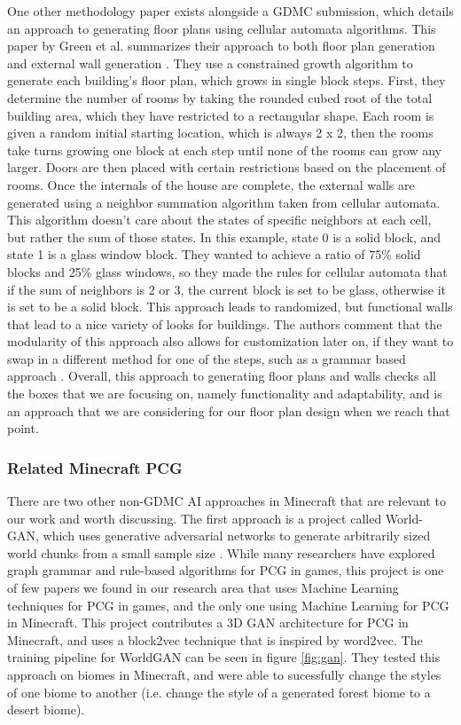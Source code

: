 \documentclass[11pt, oneside]{article}
\begin{document}
\begin{normalsize}
One other methodology paper exists alongside a GDMC submission, which details an approach to generating floor plans using cellular automata algorithms. This paper by Green et al. summarizes their approach to both floor plan generation and external wall generation \cite{green_organic_2019}. They use a constrained growth algorithm to generate each building's floor plan, which grows in single block steps. First, they determine the number of rooms by taking the rounded cubed root of the total building area, which they have restricted to a rectangular shape. Each room is given a random initial starting location, which is always 2 x 2, then the rooms take turns growing one block at each step until none of the rooms can grow any larger. Doors are then placed with certain restrictions based on the placement of rooms. Once the internals of the house are complete, the external walls are generated using a neighbor summation algorithm taken from cellular automata. This algorithm doesn't care about the states of specific neighbors at each cell, but rather the sum of those states. In this example, state 0 is a solid block, and state 1 is a glass window block. They wanted to achieve a ratio of 75\% solid blocks and 25\% glass windows, so they made the rules for cellular automata that if the sum of neighbors is 2 or 3, the current block is set to be glass, otherwise it is set to be a solid block. This approach leads to randomized, but functional walls that lead to a nice variety of looks for buildings. The authors comment that the modularity of this approach also allows for customization later on, if they want to swap in a different method for one of the steps, such as a grammar based approach \cite{green_organic_2019}. Overall, this approach to generating floor plans and walls checks all the boxes that we are focusing on, namely functionality and adaptability, and is an approach that we are considering for our floor plan design when we reach that point.


\subsubsection{Related Minecraft PCG}

There are two other non-GDMC AI approaches in Minecraft that are relevant to our work and worth discussing. The first approach is a project called World-GAN, which uses generative adversarial networks to generate arbitrarily sized world chunks from a small sample size \cite{awiszus2021world}. While many researchers have explored graph grammar and rule-based algorithms for PCG in games, this project is one of few papers we found in our research area that uses Machine Learning techniques for PCG in games, and the only one using Machine Learning for PCG in Minecraft. This project contributes a 3D GAN architecture for PCG in Minecraft, and uses a block2vec technique that is inspired by word2vec. The training pipeline for WorldGAN can be seen in figure \ref{fig:gan}. They tested this approach on biomes in Minecraft, and were able to sucessfully change the styles of one biome to another (i.e. change the style of a generated forest biome to a desert biome).  


\end{normalsize}
\end{document}
